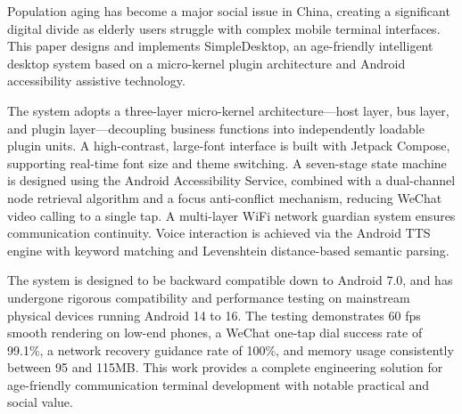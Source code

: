 Population aging has become a major social issue in China, creating a significant digital divide as elderly users struggle with complex mobile terminal interfaces. This paper designs and implements SimpleDesktop, an age-friendly intelligent desktop system based on a micro-kernel plugin architecture and Android accessibility assistive technology.

The system adopts a three-layer micro-kernel architecture—host layer, bus layer, and plugin layer—decoupling business functions into independently loadable plugin units. A high-contrast, large-font interface is built with Jetpack Compose, supporting real-time font size and theme switching. A seven-stage state machine is designed using the Android Accessibility Service, combined with a dual-channel node retrieval algorithm and a focus anti-conflict mechanism, reducing WeChat video calling to a single tap. A multi-layer WiFi network guardian system ensures communication continuity. Voice interaction is achieved via the Android TTS engine with keyword matching and Levenshtein distance-based semantic parsing.

The system is designed to be backward compatible down to Android 7.0, and has undergone rigorous compatibility and performance testing on mainstream physical devices running Android 14 to 16. The testing demonstrates 60 fps smooth rendering on low-end phones, a WeChat one-tap dial success rate of 99.1\%, a network recovery guidance rate of 100\%, and memory usage consistently between 95 and 115MB. This work provides a complete engineering solution for age-friendly communication terminal development with notable practical and social value.